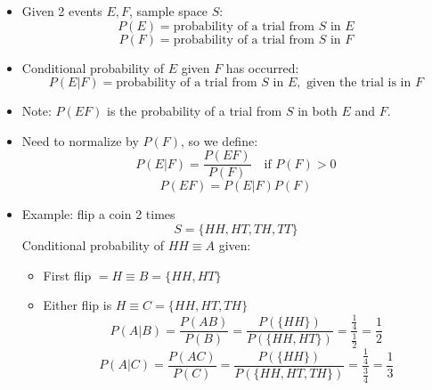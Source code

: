 \begin{itemize}
    \item Given 2 events $E, F$, sample space $S$:
          \[ P(E) = \text{probability of a trial from } S \text{ in } E \]
          \[ P(F) = \text{probability of a trial from } S \text{ in } F \]
    \item Conditional probability of $E$ given $F$ has occurred:
          \[ P(E|F) = \text{probability of a trial from } S \text{ in } E, \text{ given the trial is in } F \]
    \item Note: $P(EF)$ is the probability of a trial from $S$ in both $E$ and $F$.
    \item Need to normalize by $P(F)$, so we define:
          \[ P(E|F) = \frac{P(EF)}{P(F)} \quad \text{if } P(F) > 0 \]
          \[ P(EF) = P(E|F) P(F) \]

    \item Example: flip a coin 2 times
          \[ S = \{HH, HT, TH, TT\} \]
          Conditional probability of $HH \equiv A$ given:
          \begin{itemize}
              \item First flip $= H \equiv B = \{HH, HT\}$
              \item Either flip is $H \equiv C = \{HH, HT, TH\}$
                    \[ P(A|B) = \frac{P(AB)}{P(B)} = \frac{P(\{HH\})}{P(\{HH, HT\})} = \frac{\frac{1}{4}}{\frac{1}{2}} = \frac{1}{2} \]
                    \[ P(A|C) = \frac{P(AC)}{P(C)} = \frac{P(\{HH\})}{P(\{HH, HT, TH\})} = \frac{\frac{1}{4}}{\frac{3}{4}} = \frac{1}{3} \]
          \end{itemize}
\end{itemize}
